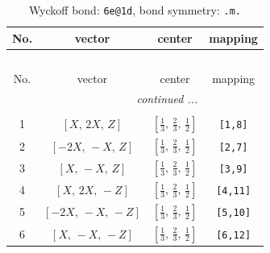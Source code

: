 \documentclass[fleqn,8pt]{jsarticle}
\begin{document}
\renewcommand{\arraystretch}{1.2}
\begin{longtable}{cccc}
\caption{Wyckoff bond: {\tt 6e@1d}, bond symmetry: {\tt .m.}}
 \\
 \hline \hline
No. & vector & center & mapping \\ \hline \endfirsthead

\multicolumn{3}{l}{\tablename\ \thetable{}} \\
 \hline \hline
No. & vector & center & mapping \\ \hline \endhead

 \hline \hline
\multicolumn{3}{r}{\footnotesize\it continued ...} \\ \endfoot

 \hline \hline
\multicolumn{3}{r}{} \\ \endlastfoot

1 & $\left[ X,\, 2 X,\, Z \right]$ & $\left[ \frac{1}{3},\, \frac{2}{3},\, \frac{1}{2} \right]$ & {\tt [1,8]} \\ \hline
2 & $\left[ - 2 X,\, - X,\, Z \right]$ & $\left[ \frac{1}{3},\, \frac{2}{3},\, \frac{1}{2} \right]$ & {\tt [2,7]} \\ \hline
3 & $\left[ X,\, - X,\, Z \right]$ & $\left[ \frac{1}{3},\, \frac{2}{3},\, \frac{1}{2} \right]$ & {\tt [3,9]} \\ \hline
4 & $\left[ X,\, 2 X,\, - Z \right]$ & $\left[ \frac{1}{3},\, \frac{2}{3},\, \frac{1}{2} \right]$ & {\tt [4,11]} \\ \hline
5 & $\left[ - 2 X,\, - X,\, - Z \right]$ & $\left[ \frac{1}{3},\, \frac{2}{3},\, \frac{1}{2} \right]$ & {\tt [5,10]} \\ \hline
6 & $\left[ X,\, - X,\, - Z \right]$ & $\left[ \frac{1}{3},\, \frac{2}{3},\, \frac{1}{2} \right]$ & {\tt [6,12]} \\
\end{longtable}
\renewcommand{\arraystretch}{1.2}
\end{document}
